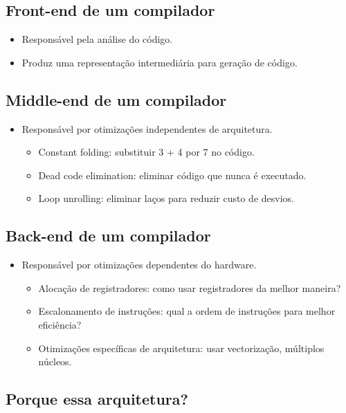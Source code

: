 \documentclass[11pt]{article}
\begin{document}
\subsection*{Front-end de um compilador}
\label{sec:org1ccda29}

\begin{itemize}
\item Responsável pela análise do código.
\item Produz uma representação intermediária para geração de código.
\end{itemize}
\subsection*{Middle-end de um compilador}
\label{sec:org7787988}

\begin{itemize}
\item Responsável por otimizações independentes de arquitetura.
\begin{itemize}
\item Constant folding: substituir 3 + 4 por 7 no código.
\item Dead code elimination: eliminar código que nunca é executado.
\item Loop unrolling: eliminar laços para reduzir custo de desvios.
\end{itemize}
\end{itemize}
\subsection*{Back-end de um compilador}
\label{sec:orgff2f145}

\begin{itemize}
\item Responsável por otimizações dependentes do hardware.
\begin{itemize}
\item Alocação de registradores: como usar registradores da melhor maneira?
\item Escalonamento de instruções: qual a ordem de instruções para melhor eficiência?
\item Otimizações específicas de arquitetura: usar vectorização, múltiplos núcleos.
\end{itemize}
\end{itemize}
\subsection*{Porque essa arquitetura?}
\label{sec:org3f9c81a}
\end{document}
